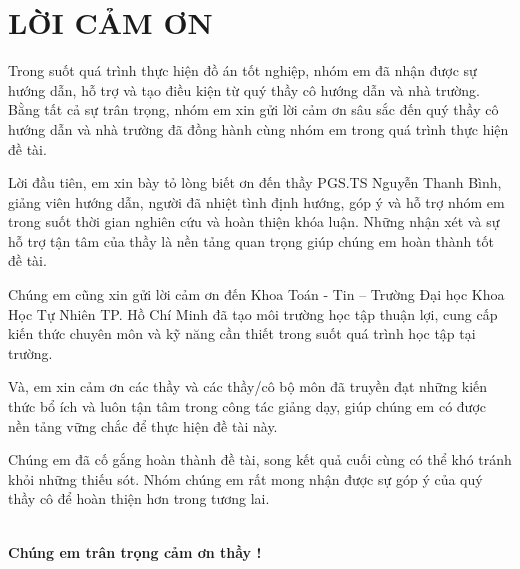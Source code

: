 \clearpage
\chapter*{\centering LỜI CẢM ƠN}

Trong suốt quá trình thực hiện đồ án tốt nghiệp, nhóm em đã nhận được sự hướng dẫn, hỗ trợ và tạo điều kiện từ quý thầy cô hướng dẫn và nhà trường. Bằng tất cả sự trân trọng, nhóm em xin gửi lời cảm ơn sâu sắc đến quý thầy cô hướng dẫn và nhà trường đã đồng hành cùng nhóm em trong quá trình thực hiện đề tài.

Lời đầu tiên, em xin bày tỏ lòng biết ơn đến thầy PGS.TS Nguyễn Thanh Bình, giảng viên hướng dẫn, người đã nhiệt tình định hướng, góp ý và hỗ trợ nhóm em trong suốt thời gian nghiên cứu và hoàn thiện khóa luận. Những nhận xét và sự hỗ trợ tận tâm của thầy là nền tảng quan trọng giúp chúng em hoàn thành tốt đề tài.

Chúng em cũng xin gửi lời cảm ơn đến Khoa Toán - Tin – Trường Đại học Khoa Học Tự Nhiên TP. Hồ Chí Minh đã tạo môi trường học tập thuận lợi, cung cấp kiến thức chuyên môn và kỹ năng cần thiết trong suốt quá trình học tập tại trường.

Và, em xin cảm ơn các thầy và các thầy/cô bộ môn đã truyền đạt những kiến thức bổ ích và luôn tận tâm trong công tác giảng dạy, giúp chúng em có được nền tảng vững chắc để thực hiện đề tài này.

Chúng em đã cố gắng hoàn thành đề tài, song kết quả cuối cùng có thể khó tránh khỏi những thiếu sót. Nhóm chúng em rất mong nhận được sự góp ý của quý thầy cô để hoàn thiện hơn trong tương lai.

\vspace{1cm}
\begin{flushright}
\\
\textbf{Chúng em trân trọng cảm ơn thầy !}
\end{flushright}
